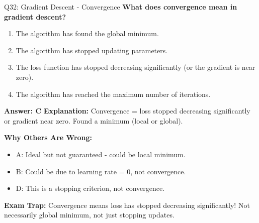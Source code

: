 \documentclass[8pt]{beamer}
\begin{document}
	\begin{frame}{Q32: Gradient Descent - Convergence}
		\fontsize{6.5}{7.5}\selectfont
		\textbf{What does convergence mean in gradient descent?}
		
		\begin{enumerate}
			\item The algorithm has found the global minimum.
			\item The algorithm has stopped updating parameters.
			\item The loss function has stopped decreasing significantly (or the gradient is near zero).
			\item The algorithm has reached the maximum number of iterations.
		\end{enumerate}
		
		\vspace{0.05cm}
		\textcolor{myblue}{\textbf{Answer: C}}
		\vspace{0.05cm}
		\textcolor{myblue}{\textbf{Explanation:}} Convergence = loss stopped decreasing significantly or gradient near zero. Found a minimum (local or global).
		
		\vspace{0.05cm}
		\textcolor{myred}{\textbf{Why Others Are Wrong:}}
		\begin{itemize}
			\item \textcolor{myred}{A:} Ideal but not guaranteed - could be local minimum.
			\item \textcolor{myred}{B:} Could be due to learning rate = 0, not convergence.
			\item \textcolor{myred}{D:} This is a stopping criterion, not convergence.
		\end{itemize}
		
		\textcolor{myred}{\textbf{Exam Trap:}} Convergence means \textcolor{myblue}{loss has stopped decreasing} significantly! Not necessarily global minimum, not just stopping updates.
	\end{frame}
	
\end{document}
